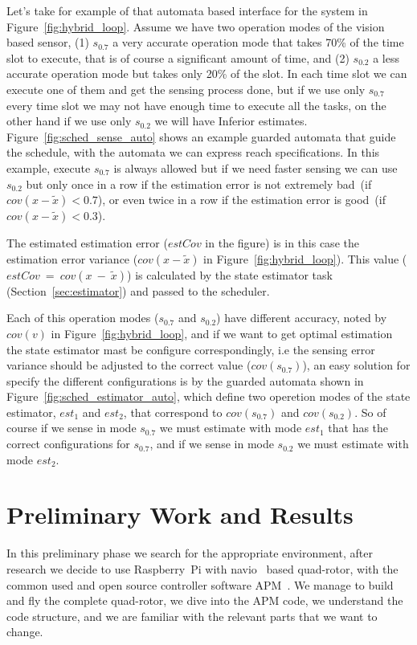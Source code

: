 \documentclass[11pt]{article}
\begin{document}
Let's take for example of that automata based interface for the system in Figure~\ref{fig:hybrid_loop}.
Assume we have two operation modes of the vision based sensor, (1) $s_{0.7}$ a very accurate operation mode that takes 70\% of the time slot to execute, that is of course a significant amount of time, and (2) $s_{0.2}$ a less accurate operation mode but takes only 20\% of the slot.
In each time slot we can execute one of them and get the sensing process done, but if we use only $s_{0.7}$ every time slot we may not have enough time to execute all the tasks, on the other hand if we use only $s_{0.2}$ we will have Inferior estimates.
Figure~\ref{fig:sched_sense_auto} shows an example guarded automata that guide the schedule, with the automata we can express reach specifications. 
In this example, execute $s_{0.7}$ is always allowed but if we need faster sensing we can use $s_{0.2}$ but only once in a row if the estimation error is not extremely bad~(if~$cov(x-\tilde{x}) < 0.7$), or even twice in a row if the estimation error is good~(if~$cov(x-\tilde{x}) < 0.3$).

The estimated estimation error ($estCov$ in the figure) is in this case the estimation error variance ($cov(x-\tilde{x})$ in Figure~\ref{fig:hybrid_loop}). 
This value ($estCov~=~cov(x~-~\tilde{x})$) is calculated by the state estimator task (Section~\ref{sec:estimator}) and passed to the scheduler.

Each of this operation modes ($s_{0.7}$ and $s_{0.2}$) have different accuracy, noted by $cov(v)$ in Figure~\ref{fig:hybrid_loop}, and if we want to get optimal estimation the state estimator mast be configure correspondingly, i.e the sensing error variance should be adjusted to the correct value ($cov(s_{0.7})$), an easy solution for specify the different configurations is by the guarded automata shown in Figure~\ref{fig:sched_estimator_auto}, which define two operetion modes of the state estimator, $est_1$ and $est_2$, that correspond to $cov(s_{0.7})$ and $cov(s_{0.2})$. So of course if we sense in mode $s_{0.7}$ we must estimate with mode $est_1$ that has the correct configurations for $s_{0.7}$, and if we sense in mode $s_{0.2}$ we must estimate with mode $est_2$.

\section{Preliminary Work and Results}
\label{sec:results}
In this preliminary phase we search for the appropriate environment, after research we decide to use Raspberry~Pi with navio~\cite{navio} based quad-rotor, with the common used and open source controller software APM~\cite{APM}.
We manage to build and fly the complete quad-rotor, we dive into the APM code, we understand the code structure, and we are familiar with the relevant parts that we want to change.
\end{document}
